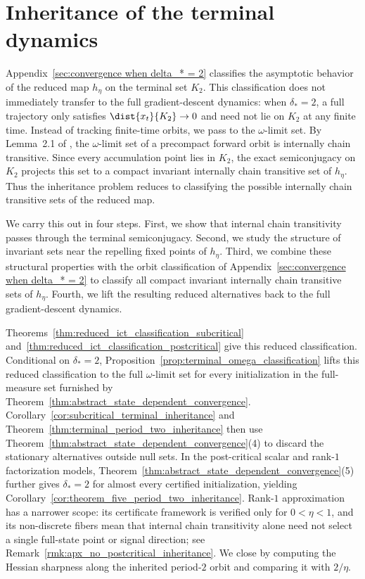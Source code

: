 \documentclass{article}
\begin{document}

\section{Inheritance of the terminal dynamics}
\label{sec:terminal_inheritance}

Appendix~\ref{sec:convergence when delta_* = 2} classifies the asymptotic
behavior of the reduced map $h_\eta$ on the terminal set $K_2$. This
classification does not immediately transfer to the full gradient-descent
dynamics: when $\delta_\ast=2$, a full trajectory only satisfies
$\dist{x_t}{K_2}\to0$ and need not lie on $K_2$ at any finite time. Instead of
tracking finite-time orbits, we pass to the $\omega$-limit set. By Lemma~2.1 of
\citet{hirsch2001chain}, the $\omega$-limit set of a precompact forward orbit is
internally chain transitive. Since every accumulation point lies in $K_2$, the
exact semiconjugacy on $K_2$ projects this set to a compact invariant internally
chain transitive set of $h_\eta$. Thus the inheritance problem reduces to
classifying the possible internally chain transitive sets of the reduced map.

We carry this out in four steps. First, we show that internal chain transitivity
passes through the terminal semiconjugacy. Second, we study the structure of
invariant sets near the repelling fixed points of $h_\eta$. Third, we combine
these structural properties with the orbit classification of
Appendix~\ref{sec:convergence when delta_* = 2} to classify all compact
invariant internally chain transitive sets of $h_\eta$. Fourth, we lift the
resulting reduced alternatives back to the full gradient-descent dynamics.

Theorems~\ref{thm:reduced_ict_classification_subcritical}
and~\ref{thm:reduced_ict_classification_postcritical} give this reduced
classification. Conditional on
$\delta_\ast=2$, Proposition~\ref{prop:terminal_omega_classification} lifts this
reduced classification to the full $\omega$-limit set for every initialization
in the full-measure set furnished by
Theorem~\ref{thm:abstract_state_dependent_convergence}.
Corollary~\ref{cor:subcritical_terminal_inheritance} and
Theorem~\ref{thm:terminal_period_two_inheritance} then use
Theorem~\ref{thm:abstract_state_dependent_convergence}(4) to discard the
stationary alternatives outside null sets. In the post-critical scalar and
rank-$1$ factorization models,
Theorem~\ref{thm:abstract_state_dependent_convergence}(5) further gives
$\delta_\ast=2$ for almost every certified initialization, yielding
Corollary~\ref{cor:theorem_five_period_two_inheritance}. Rank-$1$ approximation
has a narrower scope: its certificate framework is verified only for
$0<\eta<1$, and its non-discrete fibers mean that internal chain transitivity
alone need not select a single full-state point or signal direction; see
Remark~\ref{rmk:apx_no_postcritical_inheritance}. We close by computing the
Hessian sharpness along the inherited period-$2$ orbit and comparing it with
$2/\eta$.
\end{document}
